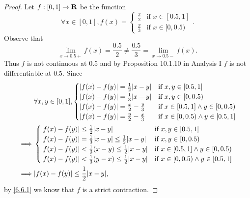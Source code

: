\begin{proof}
  Let \(f : [0, 1] \to \mathbf{R}\) be the function
  \[
    \forall x \in [0, 1], f(x) = \begin{cases}
      \frac{x}{2} & \text{if } x \in [0.5, 1] \\
      \frac{x}{3} & \text{if } x \in [0, 0.5)
    \end{cases}.
  \]
  Observe that
  \[
    \lim_{x \to 0.5+} f(x) = \frac{0.5}{2} \neq \frac{0.5}{3} = \lim_{x \to 0.5-} f(x).
  \]
  Thus \(f\) is not continuous at \(0.5\) and by Proposition 10.1.10 in Analysis I \(f\) is not differentiable at \(0.5\).
  Since
  \begin{align*}
             & \forall x, y \in [0, 1], \begin{cases}
                                          \abs{f(x) - f(y)} = \frac{1}{2} \abs{x - y}   & \text{if } x, y \in [0.5, 1]                   \\
                                          \abs{f(x) - f(y)} = \frac{1}{3} \abs{x - y}   & \text{if } x, y \in [0, 0.5)                   \\
                                          \abs{f(x) - f(y)} = \frac{x}{2} - \frac{y}{3} & \text{if } x \in [0.5, 1] \land y \in [0, 0.5) \\
                                          \abs{f(x) - f(y)} = \frac{y}{2} - \frac{x}{3} & \text{if } x \in [0, 0.5) \land y \in [0.5, 1]
                                        \end{cases}   \\
    \implies & \begin{cases}
                 \abs{f(x) - f(y)} \leq \frac{1}{2} \abs{x - y}                           & \text{if } x, y \in [0.5, 1]                   \\
                 \abs{f(x) - f(y)} = \frac{1}{3} \abs{x - y} \leq \frac{1}{2} \abs{x - y} & \text{if } x, y \in [0, 0.5)                   \\
                 \abs{f(x) - f(y)} < \frac{1}{3} (x - y) \leq \frac{1}{2} \abs{x - y}     & \text{if } x \in [0.5, 1] \land y \in [0, 0.5) \\
                 \abs{f(x) - f(y)} < \frac{1}{3} (y - x) \leq \frac{1}{2} \abs{x - y}     & \text{if } x \in [0, 0.5) \land y \in [0.5, 1]
               \end{cases} \\
    \implies & \abs{f(x) - f(y)} \leq \frac{1}{2} \abs{x - y},
  \end{align*}
  by \cref{6.6.1} we know that \(f\) is a strict contraction.
\end{proof}

